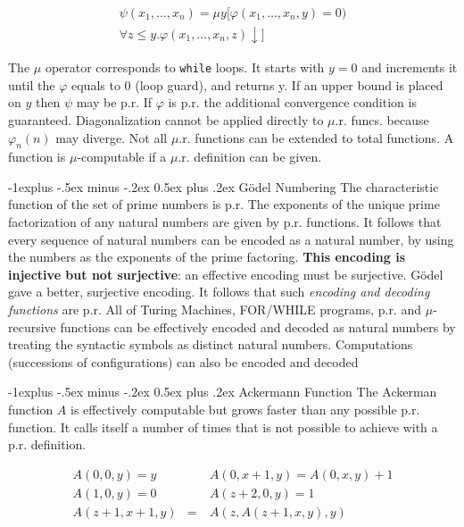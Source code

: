 \documentclass[10pt,landscape]{article}
\makeatletter
\newcommand{\conv}{\downarrow}
\theoremstyle{plain}%
\theoremstyle{definition}
\theoremstyle{remark}
\renewcommand{\subsection}{\@startsection{subsection}{2}{0mm}%
                                {-1explus -.5ex minus -.2ex}%
                                {0.5ex plus .2ex}%
                                {\normalfont\normalsize\bfseries}}
\makeatother
\begin{document}
\begin{multicols}{4}
\begin{eqnarray*}
    \psi(x_1, \hdots, x_n) = \mu y [\varphi(x_1, \hdots, x_n, y) = 0) \\
    \forall z \leq y . \varphi(x_1, \hdots, x_n, z) \conv ]
\end{eqnarray*}

The $\mu$ operator corresponds to \texttt{while} loops. It starts with $y=0$ and
increments it until the $\varphi$ equals to 0 (loop guard), and returns y.
If an upper bound is placed on $y$ then $\psi$ may be p.r. 
If $\varphi$ is p.r. the additional convergence condition is guaranteed. 
Diagonalization cannot be applied directly to $\mu$.r. funcs. because $\varphi_n(n)$ may diverge.
Not all $\mu$.r. functions can be extended to total functions.
A function is $\mu$-computable if a $\mu$.r. definition can be given.

\subsection{Gödel Numbering}
The characteristic function of the set of prime numbers is p.r. The exponents 
of the unique prime factorization of any natural numbers are given by p.r. functions. 
It follows that every sequence of natural numbers can be encoded as a natural number,
by using the numbers as the exponents of the prime factoring.
\textbf{This encoding is injective but not surjective}: an effective encoding must be surjective. 
Gödel gave a better, surjective encoding.
It follows that such \textit{encoding and decoding functions} are p.r.
All of Turing Machines, FOR/WHILE programs, p.r. and $\mu$-recursive functions can be effectively encoded
and decoded as natural numbers by treating the syntactic symbols as distinct natural numbers.
Computations (successions of configurations) can also be encoded and decoded

\subsection{Ackermann Function}
The Ackerman function $A$ is effectively computable but grows faster than any possible p.r. function.
It calls itself a number of times that is not possible to achieve with a p.r. definition.


\begin{equation*}
    \begin{aligned}
        A(0,0,y) = y & \quad & A(0,x+1, y) = A(0,x,y) + 1 \\ 
        A(1,0,y) = 0 & \quad & A(z+2, 0,y) = 1 \\ 
        A(z+1,x+1,y) &=&   A(z, A(z+1,x,y),y)
    \end{aligned}
\end{equation*}


\end{multicols}
\end{document}
